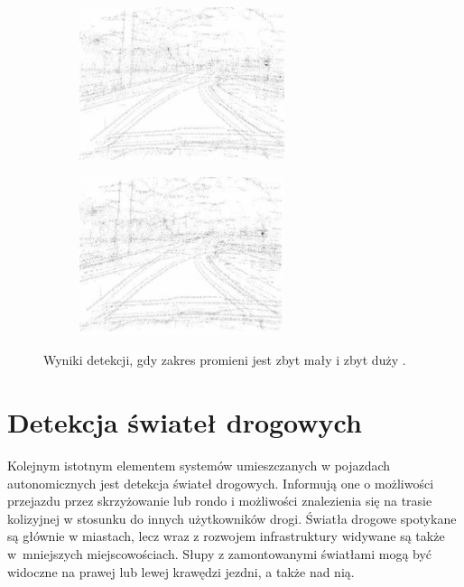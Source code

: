 \begin{figure}[h]
	\centering
	\begin{subfigure}{0.35\textwidth}
		\centering
		\includegraphics[width=6cm]{img/znaki2.png}
		\subcaption{\label{fig:znaki2}}
	\end{subfigure}
	\begin{subfigure}{0.35\textwidth}
		\centering
		\includegraphics[width=6cm]{img/znaki3.png}
		\subcaption{\label{fig:znaki3}}
	\end{subfigure}
	
	\caption{\label{fig:details}Wyniki detekcji, gdy zakres promieni jest zbyt mały \protect{} i zbyt duży \protect{}.\cite{T2}}
\end{figure}


\section{Detekcja świateł drogowych}
\label{sec:tl}
Kolejnym istotnym elementem systemów umieszczanych w pojazdach autonomicznych jest detekcja świateł drogowych.
Informują one o możliwości przejazdu przez skrzyżowanie lub rondo i możliwości znalezienia się na trasie kolizyjnej w stosunku do innych użytkowników drogi. %
Światła drogowe spotykane są głównie w miastach, lecz wraz z rozwojem infrastruktury widywane są także w~mniejszych miejscowościach. 
Słupy z zamontowanymi światłami mogą być widoczne na prawej lub lewej krawędzi jezdni, a także nad nią.

